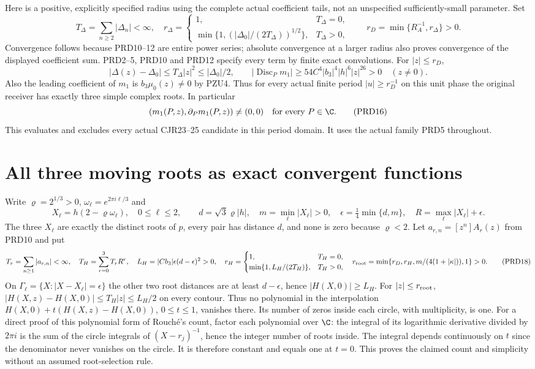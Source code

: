 Here is a positive, explicitly specified radius using the complete
actual coefficient tails, not an unspecified sufficiently-small
parameter. Set
\[
 T_\Delta=\sum_{n\ge2}|\Delta_n|<\infty,\quad
 r_\Delta=\begin{cases}
 1,&T_\Delta=0,\\
 \min\{1,(|\Delta_0|/(2T_\Delta))^{1/2}\},&T_\Delta>0,
 \end{cases}
 \qquad r_D=\min\{R_A^{-1},r_\Delta\}>0.
 \tag{PRD14}
\]
Convergence follows because PRD10--12 are entire power series;
absolute convergence at a larger radius also proves convergence
of the displayed coefficient sum. PRD2--5, PRD10 and PRD12
specify every term by finite exact convolutions. For $|z|\le r_D$,
\[
 |\Delta(z)-\Delta_0|\le T_\Delta|z|^2
       \le|\Delta_0|/2,
 \qquad
 |\operatorname{Disc}_Pm_1|\ge54C^4|b_3|^4|h|^6|z|^{26}>0
 \quad(z\ne0).
 \tag{PRD15}
\]
Also the leading coefficient of $m_1$ is $b_3\mu_0(z)\ne0$
by PZU4. Thus for every actual finite period $|u|\ge r_D^{-1}$
on this unit phase the original receiver has exactly three simple
complex roots. In particular
\[
 (m_1(P,z),\partial_Pm_1(P,z))\ne(0,0)
              \quad\text{for every }P\in\C.
 \tag{PRD16}
\]
This evaluates and excludes every actual CJR23--25 candidate in
this period domain. It uses the actual family PRD5 throughout.

\section{All three moving roots as exact convergent functions}
Write $\varrho=2^{1/3}>0$, $\omega_\ell=e^{2\pi i\ell/3}$ and
\[
 X_\ell=h(2-\varrho\omega_\ell),\quad 0\le\ell\le2,
 \qquad d=\sqrt3\varrho|h|,
 \quad m=\min_\ell|X_\ell|>0,
 \quad \epsilon=\tfrac14\min\{d,m\},
 \quad R=\max_\ell|X_\ell|+\epsilon.
 \tag{PRD17}
\]
The three $X_\ell$ are exactly the distinct roots of $p$, every
pair has distance $d$, and none is zero because $\varrho<2$.
Let $a_{r,n}=[z^n]A_r(z)$ from PRD10 and put
\[
 T_r=\sum_{n\ge1}|a_{r,n}|<\infty,\quad
 T_H=\sum_{r=0}^3T_rR^r,\quad
 L_H=|Cb_3|\epsilon(d-\epsilon)^2>0,
 \quad
 r_H=\begin{cases}1,&T_H=0,\\
 \min\{1,L_H/(2T_H)\},&T_H>0,
 \end{cases}
 \quad r_{\rm root}=\min\{r_D,r_H,m/(4(1+|\kappa|)),1\}>0.
 \tag{PRD18}
\]
On $\Gamma_\ell=\{X:|X-X_\ell|=\epsilon\}$ the other two
root distances are at least $d-\epsilon$, hence
$|H(X,0)|\ge L_H$. For $|z|\le r_{\rm root}$,
$|H(X,z)-H(X,0)|\le T_H|z|\le L_H/2$ on every contour.
Thus no polynomial in the interpolation
$H(X,0)+t(H(X,z)-H(X,0))$, $0\le t\le1$, vanishes there.
Its number of zeros inside each circle, with multiplicity, is one.
For a direct proof of this polynomial form of Rouch\'e's count,
factor each polynomial over $\C$: the integral of its logarithmic
derivative divided by $2\pi i$ is the sum of the circle integrals
of $(X-r_j)^{-1}$, hence the integer number of roots inside.
The integral depends continuously on $t$ since the denominator
never vanishes on the circle. It is therefore constant and equals
one at $t=0$. This proves the claimed count and simplicity without
an assumed root-selection rule.


